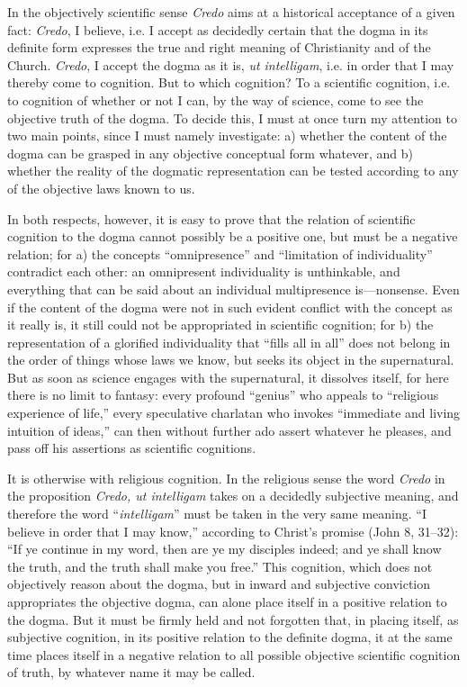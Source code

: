 \documentclass[12pt,a4paper,openany]{book}
\newcommand{\opage}[1]{\marginnote{\footnotesize\textit{[#1]}}}
\begin{document}
In the objectively scientific sense \textit{Credo} aims at
a historical acceptance of a given fact: \textit{Credo}, I believe,
i.e. I accept as decidedly certain that the dogma in its definite
form expresses the true and right meaning of Christianity and of the Church.
\textit{Credo}, I accept the dogma as it is, \textit{ut intelligam},
i.e. in order that I may thereby come to cognition.
But to which cognition? To a scientific cognition,
i.e. to cognition of whether or not I can, by the way of science,
come to see the objective truth of the dogma.
To decide this, I must at once turn
my attention to two main points, since I must namely
investigate: a) whether the content of the dogma can be grasped
in any objective conceptual form whatever, and b) whether the
reality of the dogmatic representation can be tested according to any
of the objective laws known to us.

In both respects, however, it is easy to prove that
the relation of scientific cognition to the dogma cannot possibly
be a positive one, but must be a negative relation;
for a) the concepts ``omnipresence'' and ``limitation of individuality''
contradict each other: an omnipresent
individuality is unthinkable, and everything that
\setcounter{footnote}{0}%
\opage{35}can be said about an individual multipresence is---nonsense.
Even if the content of the dogma were not in such evident conflict
with the concept as it really is, it still could
not be appropriated in scientific cognition; for b) the representation
of a glorified individuality that ``fills all
in all'' does not belong in the order of things whose laws
we know, but seeks its object in the supernatural.
But as soon as science engages with the supernatural,
it dissolves itself, for here there is no limit to
fantasy: every profound ``genius'' who appeals
to ``religious experience of life,'' every speculative charlatan
who invokes ``immediate and living intuition of ideas,''
can then without further ado assert whatever he pleases,
and pass off his assertions as scientific cognitions.

It is otherwise with religious cognition. In the religious
sense the word \textit{Credo} in the proposition \textit{Credo, ut intelligam}
takes on a decidedly subjective meaning, and therefore the word
``\textit{intelligam}'' must be taken in the very same meaning. ``I believe in order
that I may know,'' according to Christ's promise (John 8, 31--32):
``If ye continue in my word, then are ye my disciples
indeed; and ye shall know the truth, and the truth
shall make you free.'' This cognition, which does not objectively
reason about the dogma, but in inward and subjective conviction
appropriates the objective dogma, can alone place
itself in a positive relation to the dogma. But it must be
firmly held and not forgotten that, in placing itself, as subjective cognition,
in its positive relation to the definite dogma,
it at the same time places itself in a negative relation to all
possible objective scientific cognition of truth, by whatever
name it may be called.
\end{document}

